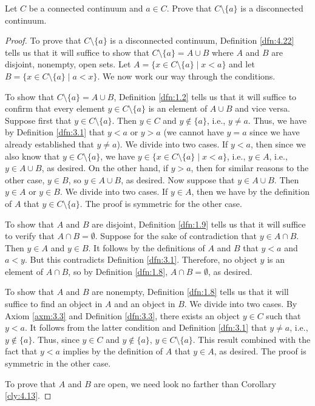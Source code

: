 \documentclass[../main.tex]{subfiles}
\begin{document}
\begin{exercise}\label{exr:4.23}
    Let $C$ be a connected continuum and $a\in C$. Prove that $C\setminus\{a\}$ is a disconnected continuum.
    \begin{proof}
        To prove that $C\setminus\{a\}$ is a disconnected continuum, Definition \ref{dfn:4.22} tells us that it will suffice to show that $C\setminus\{a\}=A\cup B$ where $A$ and $B$ are disjoint, nonempty, open sets. Let $A=\{x\in C\setminus\{a\}\mid x<a\}$ and let $B=\{x\in C\setminus\{a\}\mid a<x\}$. We now work our way through the conditions.\par
        To show that $C\setminus\{a\}=A\cup B$, Definition \ref{dfn:1.2} tells us that it will suffice to confirm that every element $y\in C\setminus\{a\}$ is an element of $A\cup B$ and vice versa. Suppose first that $y\in C\setminus\{a\}$. Then $y\in C$ and $y\notin\{a\}$, i.e., $y\neq a$. Thus, we have by Definition \ref{dfn:3.1} that $y<a$ or $y>a$ (we cannot have $y=a$ since we have already established that $y\neq a$). We divide into two cases. If $y<a$, then since we also know that $y\in C\setminus\{a\}$, we have $y\in\{x\in C\setminus\{a\}\mid x<a\}$, i.e., $y\in A$, i.e., $y\in A\cup B$, as desired. On the other hand, if $y>a$, then for similar reasons to the other case, $y\in B$, so $y\in A\cup B$, as desired. Now suppose that $y\in A\cup B$. Then $y\in A$ or $y\in B$. We divide into two cases. If $y\in A$, then we have by the definition of $A$ that $y\in C\setminus\{a\}$. The proof is symmetric for the other case.\par
        To show that $A$ and $B$ are disjoint, Definition \ref{dfn:1.9} tells us that it will suffice to verify that $A\cap B=\emptyset$. Suppose for the sake of contradiction that $y\in A\cap B$. Then $y\in A$ and $y\in B$. It follows by the definitions of $A$ and $B$ that $y<a$ and $a<y$. But this contradicts Definition \ref{dfn:3.1}. Therefore, no object $y$ is an element of $A\cap B$, so by Definition \ref{dfn:1.8}, $A\cap B=\emptyset$, as desired.\par
        To show that $A$ and $B$ are nonempty, Definition \ref{dfn:1.8} tells us that it will suffice to find an object in $A$ and an object in $B$. We divide into two cases. By Axiom \ref{axm:3.3} and Definition \ref{dfn:3.3}, there exists an object $y\in C$ such that $y<a$. It follows from the latter condition and Definition \ref{dfn:3.1} that $y\neq a$, i.e., $y\notin\{a\}$. Thus, since $y\in C$ and $y\notin\{a\}$, $y\in C\setminus\{a\}$. This result combined with the fact that $y<a$ implies by the definition of $A$ that $y\in A$, as desired. The proof is symmetric in the other case.\par
        To prove that $A$ and $B$ are open, we need look no farther than Corollary \ref{cly:4.13}.
    \end{proof}
\end{exercise}
\end{document}
